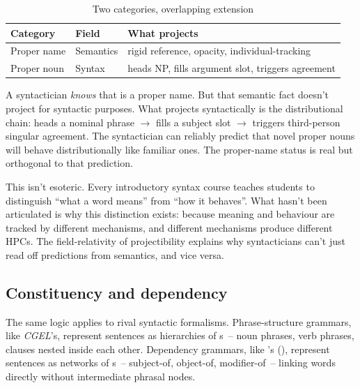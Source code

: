 \begin{table}[t]
\centering
\caption{Two categories, overlapping extension}
\label{tab:proper-noun-name}
\begin{tabular}{lll}
\toprule
\textbf{Category} & \textbf{Field} & \textbf{What projects} \\
\midrule
Proper name & Semantics & rigid reference, opacity, individual-tracking \\
Proper noun & Syntax & heads NP, fills argument slot, triggers agreement \\
\bottomrule
\end{tabular}
\end{table}

A syntactician \emph{knows} that  is a proper name. But that semantic fact doesn't project for syntactic purposes. What projects syntactically is the distributional chain:  heads a nominal phrase $\rightarrow$ fills a subject slot $\rightarrow$ triggers third-person singular agreement. The syntactician can reliably predict that novel proper nouns will behave distributionally like familiar ones. The proper-name status is real but orthogonal to that prediction.

This isn't esoteric. Every introductory syntax course teaches students to distinguish \enquote{what a word means} from \enquote{how it behaves}. What hasn't been articulated is why this distinction exists: because meaning and behaviour are tracked by different mechanisms, and different mechanisms produce different HPCs. The field-relativity of projectibility explains why syntacticians can't just read off predictions from semantics, and vice versa.

\subsection{Constituency and dependency}
\label{sec:7:constituency-dependency}

The same logic applies to rival syntactic formalisms. Phrase-structure grammars, like \textit{CGEL}'s, represent sentences as hierarchies of s~-- noun phrases, verb phrases, clauses nested inside each other. Dependency grammars, like \citeauthor{gibson2025}'s (\citeyear{gibson2025}), represent sentences as networks of s~-- subject-of, object-of, modifier-of~-- linking words directly without intermediate phrasal nodes.

